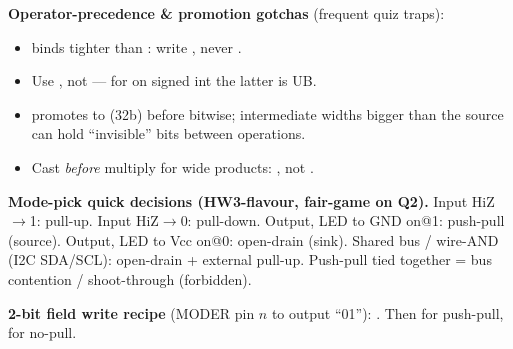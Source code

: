 \begin{qp}\textbf{Operator-precedence \& promotion gotchas} (frequent quiz traps):
\begin{itemize}
\item \cee{==} binds tighter than \cee{\&}: write , never .
\item Use , not  — for  on signed int the latter is UB.
\item {} promotes to  (32b) before bitwise; intermediate widths bigger than the source can hold ``invisible'' bits between operations.
\item Cast \emph{before} multiply for wide products: , not .
\end{itemize}\end{qp}

\begin{ex}\textbf{Mode-pick quick decisions (HW3-flavour, fair-game on Q2).} Input HiZ$\to$1: pull-up. Input HiZ$\to$0: pull-down. Output, LED to GND on@1: push-pull (source). Output, LED to Vcc on@0: open-drain (sink). Shared bus / wire-AND (I2C SDA/SCL): open-drain + external pull-up. Push-pull tied together = bus contention / shoot-through (forbidden).\end{ex}

\begin{ex}\textbf{2-bit field write recipe} (MODER pin $n$ to output ``01''): . Then  for push-pull,  for no-pull.\end{ex}
